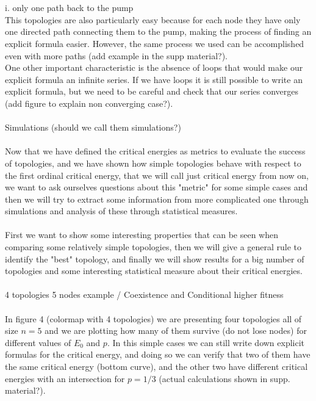 \documentclass{amsart}
\theoremstyle{plain}
\numberwithin{equation}{section}
\begin{document}
\\
\\
  i. only one path back to the pump\\
  This topologies are also particularly easy because for each node they have only one directed path connecting them to the pump, making the process of finding an explicit formula easier. However, the same process we used can be accomplished even with more paths (add example in the supp material?).\\
   One other important characteristic is the absence of loops that would make our explicit formula an infinite series. If we have loops it is still possible to write an explicit formula, but we need to be careful and check that our series converges (add figure to explain non converging case?).\\
	\\
Simulations (should we call them simulations?)\\
\\
Now that we have defined the critical energies as metrics to evaluate the success of topologies, and we have shown how simple topologies behave with respect to the first ordinal critical energy, that we will call just critical energy from now on, we want to ask ourselves questions about this "metric" for some simple cases and then we will try to extract some information from more complicated one through simulations and analysis of these through statistical measures.\\
\\
First we want to show some interesting properties that can be seen when comparing some relatively simple topologies, then we will give a general rule to identify the "best" topology, and finally we will show results for a big number of topologies and some interesting statistical measure about their critical energies.\\
\\
4 topologies 5 nodes example / Coexistence and Conditional higher fitness\\\\
In figure 4 (colormap with 4 topologies) we are presenting four topologies all of size $n=5$ and we are plotting how many of them survive (do not lose nodes) for different values of $E_0$ and $p$. In  this simple cases we can still write down explicit formulas for the critical energy, and doing so we can verify that two of them have the same critical energy (bottom curve), and the other two have different critical energies with an intersection for $p=1/3$ (actual calculations shown in supp. material?).\\
\end{document}
